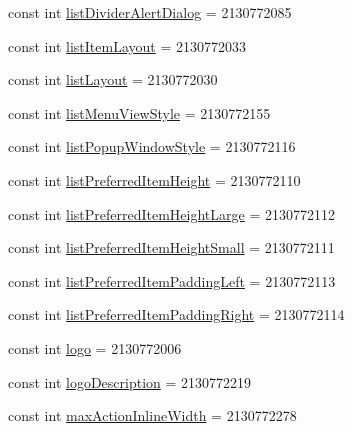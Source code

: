 \begin{DoxyCompactItemize}
\item 
const int \mbox{\hyperlink{class_f_w_p_s___app_1_1_droid_1_1_resource_1_1_attribute_aa4340b79ddee8d2c0658f209b1075969}{list\+Divider\+Alert\+Dialog}} = 2130772085
\item 
const int \mbox{\hyperlink{class_f_w_p_s___app_1_1_droid_1_1_resource_1_1_attribute_a8c26059cf9c4ce17338c5daa58baf1d0}{list\+Item\+Layout}} = 2130772033
\item 
const int \mbox{\hyperlink{class_f_w_p_s___app_1_1_droid_1_1_resource_1_1_attribute_abdf16fc0554f6fb7c60176af71d0c3e7}{list\+Layout}} = 2130772030
\item 
const int \mbox{\hyperlink{class_f_w_p_s___app_1_1_droid_1_1_resource_1_1_attribute_a9ab13a3068ca3f432d9427656b7654c7}{list\+Menu\+View\+Style}} = 2130772155
\item 
const int \mbox{\hyperlink{class_f_w_p_s___app_1_1_droid_1_1_resource_1_1_attribute_a54bb82a9b74f5d24b2c4908574371529}{list\+Popup\+Window\+Style}} = 2130772116
\item 
const int \mbox{\hyperlink{class_f_w_p_s___app_1_1_droid_1_1_resource_1_1_attribute_a8452277c85b1735a1e77c5eba53b0edb}{list\+Preferred\+Item\+Height}} = 2130772110
\item 
const int \mbox{\hyperlink{class_f_w_p_s___app_1_1_droid_1_1_resource_1_1_attribute_a30eadc70fadce320ac7caf7e6a2dc172}{list\+Preferred\+Item\+Height\+Large}} = 2130772112
\item 
const int \mbox{\hyperlink{class_f_w_p_s___app_1_1_droid_1_1_resource_1_1_attribute_afa3e3a6cf8098139412b46407bf583e0}{list\+Preferred\+Item\+Height\+Small}} = 2130772111
\item 
const int \mbox{\hyperlink{class_f_w_p_s___app_1_1_droid_1_1_resource_1_1_attribute_a472a3b777ee74e62152aa6b605a01238}{list\+Preferred\+Item\+Padding\+Left}} = 2130772113
\item 
const int \mbox{\hyperlink{class_f_w_p_s___app_1_1_droid_1_1_resource_1_1_attribute_a11451cfba4ac7b2ae9eeb9f3939ba7f2}{list\+Preferred\+Item\+Padding\+Right}} = 2130772114
\item 
const int \mbox{\hyperlink{class_f_w_p_s___app_1_1_droid_1_1_resource_1_1_attribute_ae711a6c785bc9d16ba4ee23900b97188}{logo}} = 2130772006
\item 
const int \mbox{\hyperlink{class_f_w_p_s___app_1_1_droid_1_1_resource_1_1_attribute_a2447bf2e68219d491013500042d257b9}{logo\+Description}} = 2130772219
\item 
const int \mbox{\hyperlink{class_f_w_p_s___app_1_1_droid_1_1_resource_1_1_attribute_a54d05c4fb5f40ee841cc032ef08a4ee8}{max\+Action\+Inline\+Width}} = 2130772278

\end{DoxyCompactItemize}
